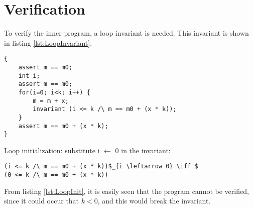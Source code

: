 \documentclass[Main_Assignment4]{subfiles}
\begin{document}
\section{Verification}
To verify the inner program, a loop invariant is needed. This invariant is shown in listing \ref{lst:LoopInvariant}. 

\begin{lstlisting}[mathescape, caption=Loop invariant, label=lst:LoopInvariant]
{
	assert m == m0;
	int i;
	assert m == m0;
	for(i=0; i<k; i++) {
		m = m + x;
		invariant (i <= k /\ m == m0 + (x * k));
	}
	assert m == m0 + (x * k);
}
\end{lstlisting}


Loop initialization: substitute i $\leftarrow$ 0 in the invariant:
\begin{lstlisting}[mathescape, caption=Loop initialization, label=lst:LoopInit]
(i <= k /\ m == m0 + (x * k))$_{i \leftarrow 0} \iff $ 
(0 <= k /\ m == m0 + (x * k))  
\end{lstlisting}
From listing \ref{lst:LoopInit}, it is easily seen that the program cannot be verified, since it could occur that $k < 0$, and this would break the invariant.
\end{document}
